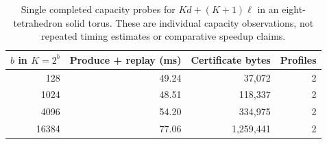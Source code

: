 \begin{table}[htbp]
\centering\small
\setlength{\tabcolsep}{4pt}
\begin{tabular}{@{}rrrr@{}}
\toprule
$b$ in $K=2^b$ & Produce + replay (ms) & Certificate bytes & Profiles\\
\midrule
128 & 49.24 & 37,072 & 2\\
1024 & 48.51 & 118,337 & 2\\
4096 & 54.20 & 334,975 & 2\\
16384 & 77.06 & 1,259,441 & 2\\
\bottomrule
\end{tabular}
\caption{Single completed capacity probes for $K d+(K+1)\ell$ in an eight-tetrahedron solid torus. These are individual capacity observations, not repeated timing estimates or comparative speedup claims.}
\label{tab:capacity}
\end{table}
